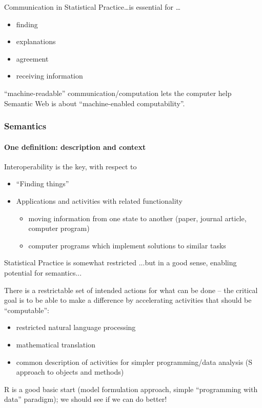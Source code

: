 \documentclass{beamer}
\begin{document}
\begin{frame}{Communication in Statistical Practice}{\ldots is essential for \ldots}
  \begin{itemize}
  \item finding
  \item explanations
  \item agreement
  \item receiving information
  \end{itemize}
  \alert{``machine-readable'' communication/computation lets the
    computer help} \\
  Semantic Web is about ``machine-enabled computability''.
\end{frame}

\begin{frame}  \frametitle{Semantics}
  \framesubtitle{One definition: description and context}

  Interoperability is the key, with respect to
  \begin{itemize}
  \item ``Finding things''
  \item Applications and activities with related functionality
    \begin{itemize}
    \item moving information from one state to another (paper, journal
      article, computer program)
    \item computer programs which implement solutions to similar tasks
    \end{itemize}
  \end{itemize}
\end{frame}


\begin{frame}{Statistical Practice is somewhat restricted}
  {...but in a good sense, enabling potential for semantics...}

  There is a restrictable set of intended actions for what can be done
  -- the critical goal is to be able to make a difference by
  accelerating activities that should be ``computable'':
  \begin{itemize}
  \item restricted natural language processing
  \item mathematical translation
  \item common description of activities for simpler programming/data
    analysis (S approach to objects and methods)
  \end{itemize}
  R is a good basic start (model formulation approach, simple
  ``programming with data'' paradigm); we should see if we can do
  better!
\end{frame}
\end{document}
